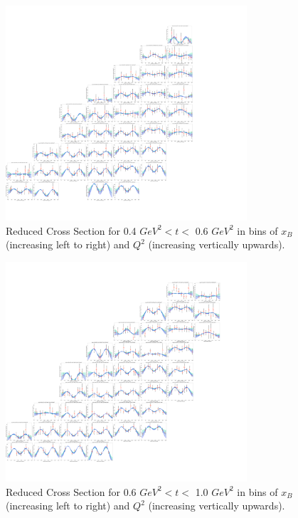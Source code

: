         \begin{figure}[ht]
            \centering
            \includegraphics[trim={14.6cm 4cm 27.2cm 4cm},clip,width=0.8\textwidth]{Chapters/Ch5-Further/c12xsec/combined_t0.4.png}
            \caption[Reduced Cross Section for 0.4 $GeV^2 < t <$ 0.6 $ GeV^2$]{Reduced Cross Section for 0.4 $ GeV^2 < t <$ 0.6 $GeV^2$ in bins of $x_B$ (increasing left to right) and $Q^2$ (increasing vertically upwards). }
            \label{fig:combined_t0.4}
        \end{figure}
        
        \begin{figure}[ht]
            \centering
            \includegraphics[trim={14.6cm 4cm 15.2cm 4cm},clip,width=0.8\textwidth]{Chapters/Ch5-Further/c12xsec/combined_t0.6.png}
            \caption[Reduced Cross Section for 0.6 $GeV^2 < t <$ 1.0 $ GeV^2$]{Reduced Cross Section for 0.6 $ GeV^2 < t <$ 1.0 $GeV^2$ in bins of $x_B$ (increasing left to right) and $Q^2$ (increasing vertically upwards). }
            \label{fig:combined_t0.6}
        \end{figure}
        
